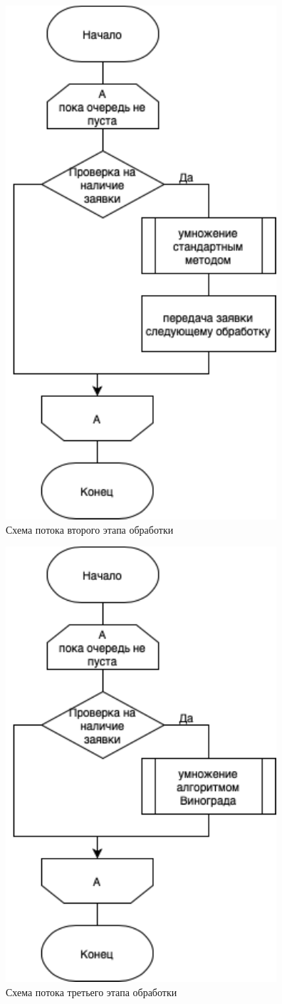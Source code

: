 \begin{figure}[h]
    \centering
    \includegraphics[width=0.6\linewidth]{img/pip2.pdf}
    \caption{Схема потока второго этапа обработки}
    \label{fig:pip2}
\end{figure}

\begin{figure}[h]
    \centering
    \includegraphics[width=0.6\linewidth]{img/pip3.pdf}
    \caption{Схема потока третьего этапа обработки}
    \label{fig:pip3}
\end{figure}

